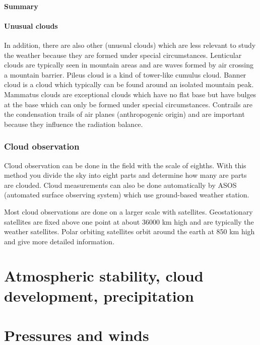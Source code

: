 \documentclass[oneside]{book}
\begin{document}
\subsubsection{Summary}\label{summary}

\subsubsection{Unusual clouds}\label{unusual-clouds}

In addition, there are also other (unusual clouds) which are less
relevant to study the weather because they are formed under special
circumstances. Lenticular clouds are typically seen in mountain areas
and are waves formed by air crossing a mountain barrier. Pileus cloud is
a kind of tower-like cumulus cloud. Banner cloud is a cloud which
typically can be found around an isolated mountain peak. Mammatus clouds
are exceptional clouds which have no flat base but have bulges at the
base which can only be formed under special circumstances. Contrails are
the condensation trails of air planes (anthropogenic origin) and are
important because they influence the radiation balance.

\subsection{Cloud observation}\label{cloud-observation}

Cloud observation can be done in the field with the scale of eighths.
With this method you divide the sky into eight parts and determine how
many are parts are clouded. Cloud measurements can also be done
automatically by ASOS (automated surface observing system) which use
ground-based weather station.

Most cloud observations are done on a larger scale with satellites.
Geostationary satellites are fixed above one point at about 36000 km
high and are typically the weather satellites. Polar orbiting satellites
orbit around the earth at 850 km high and give more detailed
information.

\chapter{Atmospheric stability, cloud development,
precipitation}\label{atmospheric-stability-cloud-development-precipitation}


\chapter{Pressures and winds}\label{pressures-and-winds}
\end{document}

